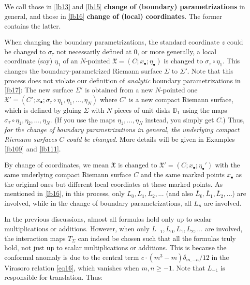 \documentclass[11pt,b5paper,notitlepage]{article}
\theoremstyle{definition}
\theoremstyle{plain}
\newcommand{\fk}{\mathfrak}
\newcommand{\ovl}{\overline}
\newcommand{\blt}{\bullet}
\newcommand{\Dbb}{\mathbb D}
\numberwithin{equation}{section}
\begin{document}
\subsection{}


We call those in \ref{lb13} and \ref{lb15} \textbf{change of (boundary) parametrizations} in general, and those in \ref{lb16} \textbf{change of (local) coordinates}. The former contains the latter. 

When changing the boundary parametrizations, the standard coordinate $z$ could be changed to $\sigma_\tau$ not necessarily  defined at $0$, or more generally, a local coordinate (say) $\eta_1$ of an $N$-pointed $\fk X=(C;x_\blt;\eta_\blt)$ is changed to $\sigma_\tau\circ\eta_1$. This changes the boundary-parametrized Riemann surface $\Sigma$ to $\Sigma'$. Note that this process does not violate our definition of \emph{analytic} boundary parametrizations in \ref{lb17}: The new surface $\Sigma'$ is obtained from a new $N$-pointed one $\fk X'=(C';x_\blt;\sigma_\tau\circ\eta_1,\eta_1,\dots,\eta_N)$ where $C'$ is a new compact Riemann surface, which is defined by gluing $\Sigma$ with $N$ pieces of unit  disks $\Dbb_1$ using the maps $\sigma_\tau\circ\eta_1,\eta_2,\dots,\eta_N$. (If you use the maps $\eta_1,\dots,\eta_N$ instead, you simply get $C$.) Thus, \emph{for the change of boundary parametrizations in general, the underlying compact Riemann surfaces $C$ could be changed}. More details will be given in Examples \ref{lb109} and \ref{lb111}.

By change of coordinates, we mean $\fk X$ is changed to $\fk X'=(C;x_\blt;\eta_\blt')$ with the same underlying compact Riemann surface $C$ and the same marked points $x_\blt$ as the original ones but different local coordiates at these marked points. As mentioned in \ref{lb16}, in this process, only $L_0,L_1,L_2,\dots$ (and also $\ovl L_0,\ovl L_1,\ovl L_2,\dots$) are involved, while in the change of boundary parametrizations, all $L_n$ are involved. 



In the previous discussions, almost all formulas hold only up to scalar multiplications or additions. However, when only $L_{-1}, L_0, L_1, L_2,\dots$ are involved, the interaction maps $T_\Sigma$ can indeed be chosen such that all the formulas truly hold, not just up to scalar multiplications or additions. This is because the conformal anomaly is due to the central term $c\cdot (m^3-m)\delta_{m,-n}/12$ in the Virasoro relation \eqref{eq16}, which vanishes when $m,n\geq -1$. Note that $L_{-1}$ is responsible for translation. Thus:
\end{document}
